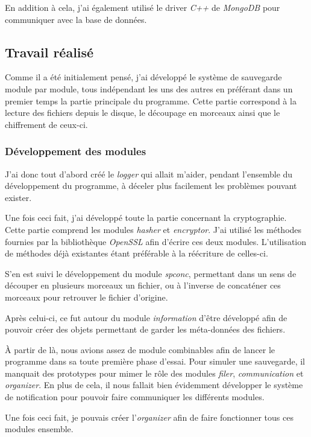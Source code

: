 \documentclass[a4paper,10pt, twoside]{report}
\begin{document}
\begin{spacing}{1.2}
En addition \`a cela, j'ai \'egalement utilis\'e le driver \textit{C++} de
\textit{MongoDB} pour communiquer avec la base de donn\'ees.

\subsection{Travail r\'ealis\'e}
Comme il a \'et\'e initialement pens\'e, j'ai d\'evelopp\'e le syst\`eme de
sauvegarde module par module, tous ind\'ependant les uns des autres en
pr\'ef\'erant dans un premier temps la partie principale du programme. Cette
partie correspond \`a la lecture des fichiers depuis le disque, le d\'ecoupage
en morceaux ainsi que le chiffrement de ceux-ci.

\subsubsection{D\'eveloppement des modules}
J'ai donc tout d'abord cr\'e\'e le \textit{logger} qui allait m'aider, pendant
l'ensemble du d\'eveloppement du programme, \`a d\'eceler plus facilement les
probl\`emes pouvant exister.

Une fois ceci fait, j'ai d\'evelopp\'e toute la partie concernant la
cryptographie. Cette partie comprend les modules \textit{hasher} et
\textit{encryptor}. J'ai utilis\'e les m\'ethodes fournies par la biblioth\`eque
\textit{OpenSSL} afin d'\'ecrire ces deux modules. L'utilisation de m\'ethodes
d\'ej\`a existantes \'etant pr\'ef\'erable \`a la r\'e\'ecriture de celles-ci.

S'en est suivi le d\'eveloppement du module \textit{spconc}, permettant dans un
sens de d\'ecouper en plusieurs morceaux un fichier, ou \`a l'inverse de
concat\'ener ces morceaux pour retrouver le fichier d'origine.

Apr\`es celui-ci, ce fut autour du module \textit{information} d'\^etre
d\'evelopp\'e afin de pouvoir cr\'eer des objets permettant de garder les
m\'eta-donn\'ees des fichiers.

\`A partir de l\`a, nous avions assez de module combinables afin de lancer le
programme dans sa toute premi\`ere phase d'essai. Pour simuler une sauvegarde,
il manquait des prototypes pour mimer le r\^ole des modules \textit{filer},
\textit{communication} et \textit{organizer}. En plus de cela, il nous fallait
bien \'evidemment d\'evelopper le syst\`eme de notification pour pouvoir faire
communiquer les diff\'erents modules.

Une fois ceci fait, je pouvais cr\'eer l'\textit{organizer} afin de faire
fonctionner tous ces modules ensemble.


\end{spacing}
\end{document}
